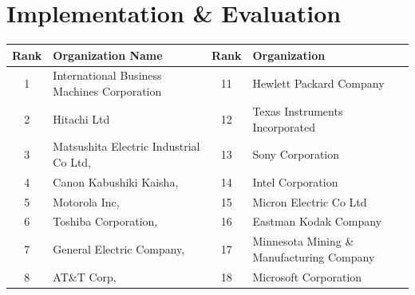 \section{Implementation \& Evaluation}
\label{sec:eval}



\begin{table}[t]
\centering
\begin{tabular}{clcl}
\hline
\multicolumn{1}{|l|}{\textbf{Rank}} & \multicolumn{1}{l|}{\textbf{Organization Name}}                  & \multicolumn{1}{l|}{\textbf{Rank}} & \multicolumn{1}{l|}{\textbf{Organization}}                     \\ \hline
\multicolumn{1}{|c|}{1}             & \multicolumn{1}{l|}{International Business Machines Corporation} & \multicolumn{1}{c|}{11}            & \multicolumn{1}{l|}{Hewlett Packard Company}                   \\ \hline
\multicolumn{1}{|c|}{2}             & \multicolumn{1}{l|}{Hitachi Ltd}                                 & \multicolumn{1}{c|}{12}            & \multicolumn{1}{l|}{Texas Instruments Incorporated}            \\ \hline
\multicolumn{1}{|c|}{3}             & \multicolumn{1}{l|}{Matsushita Electric Industrial Co Ltd,}      & \multicolumn{1}{c|}{13}            & \multicolumn{1}{l|}{Sony Corporation}                          \\ \hline
\multicolumn{1}{|c|}{4}             & \multicolumn{1}{l|}{Canon Kabushiki Kaisha,}                     & \multicolumn{1}{c|}{14}            & \multicolumn{1}{l|}{Intel Corporation}                         \\ \hline
\multicolumn{1}{|c|}{5}             & \multicolumn{1}{l|}{Motorola Inc,}                               & \multicolumn{1}{c|}{15}            & \multicolumn{1}{l|}{Micron Electric Co Ltd}                    \\ \hline
\multicolumn{1}{|c|}{6}             & \multicolumn{1}{l|}{Toshiba Corporation,}                        & \multicolumn{1}{c|}{16}            & \multicolumn{1}{l|}{Eastman Kodak Company}                     \\ \hline
\multicolumn{1}{|c|}{7}             & \multicolumn{1}{l|}{General Electric Company,}                   & \multicolumn{1}{c|}{17}            & \multicolumn{1}{l|}{Minnesota Mining \& Manufacturing Company} \\ \hline
\multicolumn{1}{|c|}{8}             & \multicolumn{1}{l|}{AT\&T Corp,}                                 & \multicolumn{1}{c|}{18}            & \multicolumn{1}{l|}{Microsoft Corporation}                     \\ \hline

\end{tabular}
\end{table}

